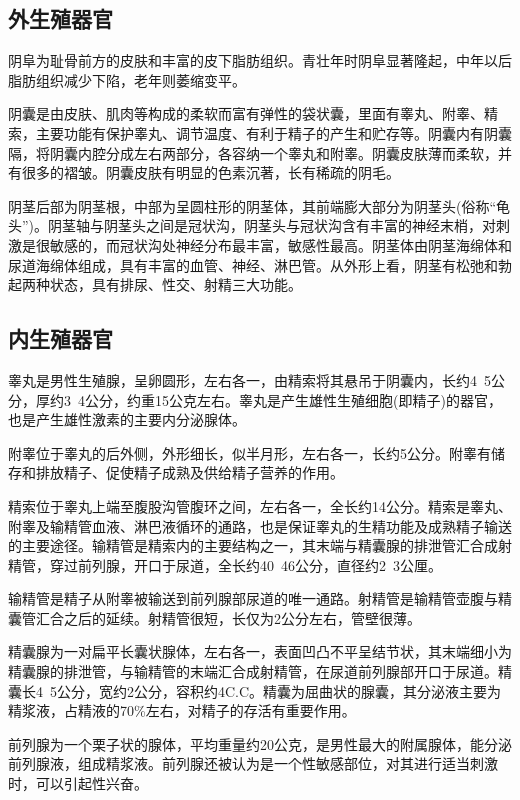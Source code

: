\documentclass[12pt,UTF8]{ctexbook}
\begin{document}
\subsection{外生殖器官}

阴阜为耻骨前方的皮肤和丰富的皮下脂肪组织。青壮年时阴阜显著隆起，中年以后脂肪组织减少下陷，老年则萎缩变平。

阴囊是由皮肤、肌肉等构成的柔软而富有弹性的袋状囊，里面有睾丸、附睾、精索，主要功能有保护睾丸、调节温度、有利于精子的产生和贮存等。阴囊内有阴囊隔，将阴囊内腔分成左右两部分，各容纳一个睾丸和附睾。阴囊皮肤薄而柔软，并有很多的褶皱。阴囊皮肤有明显的色素沉著，长有稀疏的阴毛。

阴茎后部为阴茎根，中部为呈圆柱形的阴茎体，其前端膨大部分为阴茎头(俗称“龟头”)。阴茎轴与阴茎头之间是冠状沟，阴茎头与冠状沟含有丰富的神经末梢，对刺激是很敏感的，而冠状沟处神经分布最丰富，敏感性最高。阴茎体由阴茎海绵体和尿道海绵体组成，具有丰富的血管、神经、淋巴管。从外形上看，阴茎有松弛和勃起两种状态，具有排尿、性交、射精三大功能。

\subsection{内生殖器官}

睾丸是男性生殖腺，呈卵圆形，左右各一，由精索将其悬吊于阴囊内，长约4~5公分，厚约3~4公分，约重15公克左右。睾丸是产生雄性生殖细胞(即精子)的器官，也是产生雄性激素的主要内分泌腺体。

附睾位于睾丸的后外侧，外形细长，似半月形，左右各一，长约5公分。附睾有储存和排放精子、促使精子成熟及供给精子营养的作用。

精索位于睾丸上端至腹股沟管腹环之间，左右各一，全长约14公分。精索是睾丸、附睾及输精管血液、淋巴液循环的通路，也是保证睾丸的生精功能及成熟精子输送的主要途径。输精管是精索内的主要结构之一，其末端与精囊腺的排泄管汇合成射精管，穿过前列腺，开口于尿道，全长约40~46公分，直径约2~3公厘。

输精管是精子从附睾被输送到前列腺部尿道的唯一通路。射精管是输精管壶腹与精囊管汇合之后的延续。射精管很短，长仅为2公分左右，管壁很薄。

精囊腺为一对扁平长囊状腺体，左右各一，表面凹凸不平呈结节状，其末端细小为精囊腺的排泄管，与输精管的末端汇合成射精管，在尿道前列腺部开口于尿道。精囊长4~5公分，宽约2公分，容积约4C.C。精囊为屈曲状的腺囊，其分泌液主要为精浆液，占精液的70\%左右，对精子的存活有重要作用。

前列腺为一个栗子状的腺体，平均重量约20公克，是男性最大的附属腺体，能分泌前列腺液，组成精浆液。前列腺还被认为是一个性敏感部位，对其进行适当刺激时，可以引起性兴奋。
\end{document}
